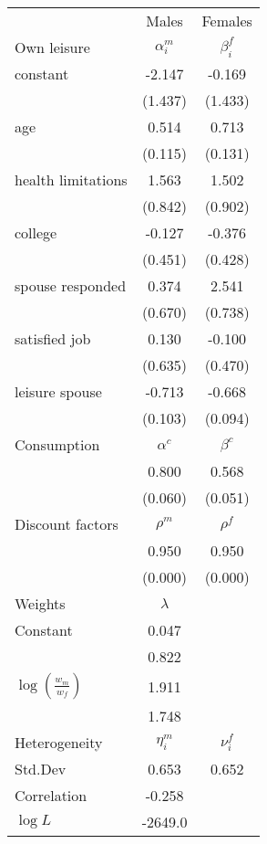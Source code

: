 \begin{tabular}{lcc} 
\hline\hline 
 & Males & Females \\ 
Own leisure & $\alpha_{i}^{m}$ & $\beta_{i}^{f}$ \\ 
constant & -2.147 & -0.169 \\ 
 & (1.437) & (1.433) \\ 
age & 0.514 & 0.713 \\ 
 & (0.115) & (0.131) \\ 
health limitations & 1.563 & 1.502 \\ 
 & (0.842) & (0.902) \\ 
college & -0.127 & -0.376 \\ 
 & (0.451) & (0.428) \\ 
spouse responded & 0.374 & 2.541 \\ 
 & (0.670) & (0.738) \\ 
satisfied job & 0.130 & -0.100 \\ 
 & (0.635) & (0.470) \\ 
leisure spouse & -0.713 & -0.668 \\ 
 & (0.103) & (0.094) \\ 
Consumption & $\alpha^{c}$ & $\beta^{c}$ \\ 
 & 0.800 & 0.568 \\ 
 & (0.060) & (0.051) \\ 
Discount factors & $\rho^m$ & $\rho^f$ \\ 
 & 0.950 & 0.950 \\ 
 & (0.000) & (0.000) \\ 
Weights & $\lambda$ &  \\ 
Constant & 0.047 &  \\ 
 & 0.822 &  \\ 
$\log(\frac{w_m}{w_f})$ & 1.911 &  \\ 
 & 1.748 &  \\ 
Heterogeneity & $\eta_i^m$ & $\nu_i^f$ \\ 
Std.Dev & 0.653 & 0.652 \\ 
Correlation & -0.258 &  \\ 
\hline 
$\log L$ & -2649.0 & \\ 
\hline \hline 
\end{tabular} 
